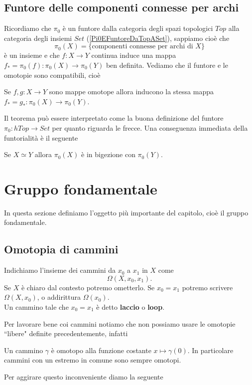 \begin{multicols*}{2}
\subsection{Funtore delle componenti connesse per archi}
Ricordiamo che $\pi_0$ è un funtore dalla categoria degli spazi topologici $Top$ alla categoria degli insiemi $Set$ (\ref{Pi0EFuntoreDaTopASet}), sappiamo cioè che
\[\pi_0(X)=\{\text{componenti connesse per archi di $X$}\}\]
è un insieme e che $f:X\to Y$ continua induce una mappa $f_\ast=\pi_0(f):\pi_0(X)\to\pi_0(Y)$ ben definita. Vediamo che il funtore e le omotopie sono compatibili, cioè
\begin{theorem}\label{MappeOmotopeInduconoLaStessaMappaNeiPi0}
Se $f,g:X\to Y$ sono mappe omotope allora inducono la stessa mappa $f_\ast=g_\ast:\pi_0(X)\to\pi_0(Y)$.
\end{theorem}
\noindent
Il teorema pu\`o essere interpretato come la buona definizione del funtore $\pi_0:hTop\to Set$ per quanto riguarda le frecce. Una conseguenza immediata della funtorialit\`a \`e il seguente
\begin{corollary}\label{SpaziOmotopicamenteEquivalentiHannoPi0InBigezione}
Se $X\simeq Y$ allora $\pi_0(X)$ è in bigezione con $\pi_0(Y)$.
\end{corollary}




















\section{Gruppo fondamentale}
In questa sezione definiamo l'oggetto più importante del capitolo, cioè il gruppo fondamentale.
\subsection{Omotopia di cammini}
\begin{notation}
Indichiamo l'insieme dei cammini da $x_0$ a $x_1$ in $X$ come
\[\Omega(X,x_0,x_1).\]
Se $X$ è chiaro dal contesto potremo ometterlo. Se $x_0=x_1$ potremo scrivere $\Omega(X,x_0)$, o addirittura $\Omega(x_0)$.\\
Un cammino tale che $x_0=x_1$ è detto \textbf{laccio} o \textbf{loop}.
\end{notation}
\noindent Per lavorare bene coi cammini notiamo che non possiamo usare le omotopie ``libere" definite precedentemente, infatti
\begin{remark}
Un cammino $\gamma$ è omotopo alla funzione costante $x\mapsto \gamma(0)$. In particolare cammini con un estremo in comune sono sempre omotopi.
\end{remark}
\noindent Per aggirare questo inconveniente diamo la seguente


\end{multicols*}
